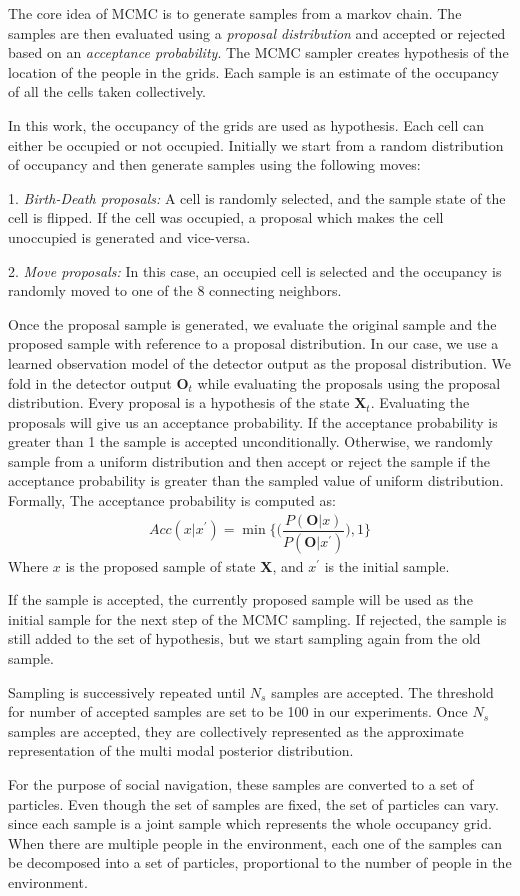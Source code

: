 The core idea of MCMC is to generate samples from a markov chain. The samples are then evaluated using a \textit{proposal distribution} and accepted or rejected based on an \textit{acceptance probability}. The MCMC sampler creates hypothesis of the location of the people in the grids. Each sample is an estimate of the occupancy of all the cells taken collectively. 

In this work, the occupancy of the grids are used as hypothesis. Each cell can either be occupied or not occupied. Initially we start from a random distribution of occupancy and then generate samples using the following moves:

1. \textit{Birth-Death proposals:}
A cell is randomly selected, and the sample state of the cell is flipped. If the cell was occupied, a proposal which makes the cell unoccupied is generated and vice-versa.

2. \textit{Move proposals:}
In this case, an occupied cell is selected and the occupancy is randomly moved to one of the 8 connecting neighbors.

Once the proposal sample is generated, we evaluate the original sample and the proposed sample with reference to a proposal distribution. In our case, we use a learned observation model of the detector output as the proposal distribution. We fold in the detector output $\textbf{O}_{t}$ while evaluating the proposals using the proposal distribution. Every proposal is a hypothesis of the state $\textbf{X}_{t}$.
Evaluating the proposals will give us an acceptance probability. If the acceptance probability is greater than 1 the sample is accepted unconditionally. 
Otherwise, we randomly sample from a uniform distribution and then accept or reject the sample if the acceptance probability is greater than the sampled value of uniform distribution. Formally,
The acceptance probability is computed as:
\begin{align}
Acc(x|x^{'}) = \min\Big\lbrace\Big(\dfrac{P(\textbf{O}|x)}{P(\textbf{O}|x^{'})}\Big),1\Big\rbrace
\end{align}
Where $x$ is the proposed sample of state \textbf{X}, and $x^{'}$ is the initial sample.

If the sample is accepted, the currently proposed sample will be used as the initial sample for the next step of the MCMC sampling. If rejected, the sample is still added to the set of hypothesis, but we start sampling again from the old sample.


Sampling is successively repeated until $N_{s}$ samples are accepted. The threshold for number of accepted samples are set to be 100 in our experiments. Once $N_{s}$ samples are accepted, they are collectively represented as the approximate representation of the multi modal posterior distribution. 

For the purpose of social navigation, these samples are converted to a set of particles. Even though the set of samples are fixed, the set of particles can vary. since each sample is a joint sample which represents the whole occupancy grid. When there are multiple people in the environment, each one of the samples can be decomposed into a set of particles, proportional to the number of people in the environment. %